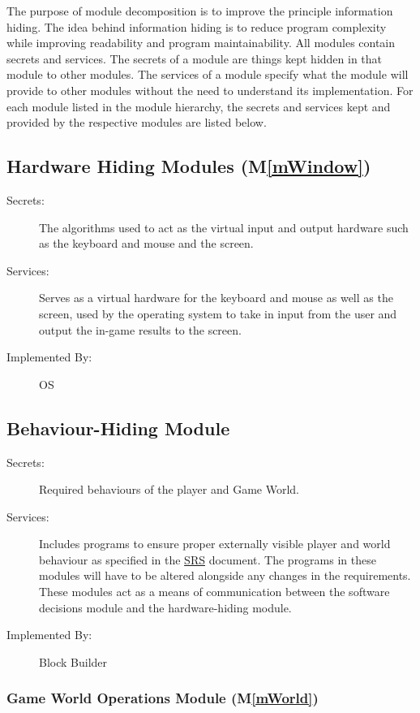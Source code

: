 \documentclass[12pt, titlepage]{article}
\newcommand{\mref}[1]{M\ref{#1}}
\begin{document}
The purpose of module decomposition is to improve the principle information hiding. The idea behind information hiding is to reduce program complexity while improving readability and program maintainability. All modules contain secrets and services. The secrets of a module are things kept hidden in that module to other modules. The services of a module specify what the module will provide to other modules without the need to understand its implementation. For each module listed in the module hierarchy, the secrets and services kept and provided by the respective modules are listed below. 

\subsection{Hardware Hiding Modules (\mref{mWindow})}

\begin{description}
\item[Secrets:] The algorithms used to act as the virtual input and output hardware such as the keyboard and mouse and the screen.
\item[Services:]Serves as a virtual hardware for the keyboard and mouse as well as the screen, used by the operating system to take in input from the user and output the in-game results to the screen.
\item[Implemented By:] OS
\end{description}

\subsection{Behaviour-Hiding Module}

\begin{description}
\item[Secrets:]Required behaviours of the player and Game World.
\item[Services:]Includes programs to ensure proper externally visible player and world behaviour as specified in the \href{https://gitlab.cas.mcmaster.ca/lucenta/3XA3/blob/master/Doc/SRS/SRS.pdf}{SRS} document. The programs in these modules will have to be altered alongside any changes in the requirements. These modules act as a means of communication between the software decisions module and the hardware-hiding module.
\item[Implemented By:] Block Builder
\end{description}

\subsubsection{Game World Operations Module (\mref{mWorld})}
\end{document}
